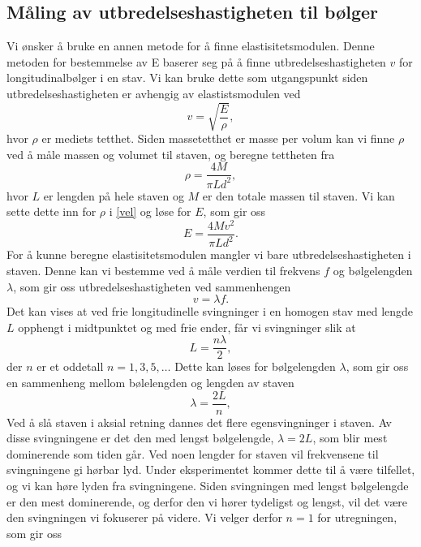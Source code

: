 \documentclass[%
 reprint,
 amsmath,amssymb,
 aps,
 norsk,
 booktabs
]{revtex4-1}
\begin{document}
\subsection{Måling av utbredelseshastigheten til bølger}\label{teori-b}
Vi ønsker å bruke en annen metode for å finne elastisitetsmodulen. Denne metoden for bestemmelse av E baserer seg på å finne utbredelseshastigheten $v$ for longitudinalbølger i en stav. Vi kan bruke dette som utgangspunkt siden utbredelseshastigheten er avhengig av elastistsmodulen ved
\begin{equation}
  v = \sqrt{\frac{E}{\rho}},\label{vel}
\end{equation}
hvor $\rho$ er mediets tetthet. Siden massetetthet er masse per volum kan vi finne $\rho$ ved å måle massen og volumet til staven, og beregne tettheten fra
\begin{equation*}
  \rho = \frac{4M}{\pi L d^2},
\end{equation*}
hvor $L$ er lengden på hele staven og $M$ er den totale massen til staven. Vi kan sette dette inn for $\rho$ i \eqref{vel} og løse for $E$, som gir oss
\begin{equation}
  E = \frac{4Mv^2}{\pi L d^2}.\label{elast}
\end{equation}
For å kunne beregne elastisitetsmodulen mangler vi bare utbredelseshastigheten i staven. Denne kan vi bestemme ved å måle verdien til frekvens $f$ og bølgelengden $\lambda$, som gir oss utbredelseshastigheten ved sammenhengen
\begin{equation}
  v = \lambda f.\label{vlf}
\end{equation}
Det kan vises \cite{oppgave} at ved frie longitudinelle svingninger i en homogen stav med lengde $L$ opphengt i midtpunktet og med frie ender, får vi svingninger slik at
\begin{equation*}
  L = \frac{n\lambda}{2},
\end{equation*}
der $n$ er et oddetall $n = 1, 3, 5, \ldots$ Dette kan løses for bølgelengden $\lambda$, som gir oss en sammenheng mellom bølelengden og lengden av staven
\begin{equation*}
  \lambda = \frac{2L}{n},
\end{equation*}
Ved å slå staven i aksial retning dannes det flere egensvingninger i staven. Av disse svingningene er det den med lengst bølgelengde, $\lambda = 2L$, som blir mest dominerende som tiden går. Ved noen lengder for staven vil frekvensene til svingningene gi hørbar lyd. Under eksperimentet kommer dette til å være tilfellet, og vi kan høre lyden fra svingningene. Siden svingningen med lengst bølgelengde er den mest dominerende, og derfor den vi hører tydeligst og lengst, vil det være den svingningen vi fokuserer på videre. Vi velger derfor $n=1$ for utregningen, som gir oss
\end{document}
